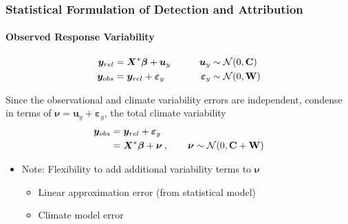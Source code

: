 \documentclass{beamer}
\newcommand{\C}{\ensuremath{\text{Cov}}}
\def\*#1{\bm{#1}}
\def\C{\textbf{\text{C}}}
\def\W{\textbf{\text{W}}}
\begin{document}
\begin{frame}
\frametitle{Statistical Formulation of Detection and Attribution}
\framesubtitle{Observed Response Variability}

\begin{block}{}
\vspace*{-\baselineskip}\setlength\belowdisplayshortskip{0pt}
\begin{alignat*}{3}
\*y_{rel} &= \*X^* \*\beta + \*u_y \nonumber  \qquad  &\*u_y &\sim \mathcal N(0,\C) \\
\*y_{obs} &= \*y_{rel} + \*\varepsilon_y &\*\varepsilon_y &\sim \mathcal N(0,\W)
\end{alignat*}
\end{block}

 Since the observational and climate variability errors are independent, condense in terms of $\*\nu = \*u_y + \*\varepsilon_y$, the total climate variability
\begin{align*}
\*y_{obs} &= \*y_{rel} + \*\varepsilon_y \\
&= \*X^* \* \beta + \*\nu \: , \qquad \* \nu \sim \mathcal{N}(0,\C + \W)
\end{align*}

\begin{itemize}
\item [] \alert{Note:} Flexibility to add additional variability terms to $\*\nu$
\begin{itemize}
\item Linear approximation error (from statistical model)
\item Climate model error
\end{itemize}
\end{itemize}
\end{frame}
\end{document}
